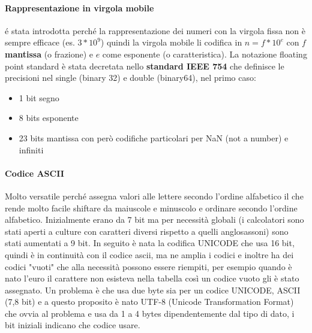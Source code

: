 \documentclass{article}
\begin{document}
\paragraph{Rappresentazione in virgola mobile} é stata introdotta perché la rappresentazione dei numeri con la virgola fissa non è sempre efficace (es. $3*10^9$) quindi la virgola mobile li codifica in $n = f*10^e$ con $f$ \textbf{mantissa} (o frazione) e $e$ come esponente (o caratteristica).
La notazione floating point standard è stata decretata nello \textbf{standard IEEE 754} che definisce le precisioni nel single (binary 32) e double (binary64), nel primo caso:
\begin{itemize}
    \item 1 bit segno
    \item 8 bits esponente
    \item 23 bits mantissa con però codifiche particolari per NaN (not a number) e infiniti
\end{itemize}


\paragraph{Codice ASCII}
Molto versatile perché assegna valori alle lettere secondo l'ordine alfabetico il che rende molto facile shiftare da maiuscole e minuscolo e ordinare secondo l'ordine alfabetico. Inizialmente erano da 7 bit ma per necessità globali (i calcolatori sono stati aperti a culture con caratteri diversi rispetto a quelli anglosassoni) sono stati aumentati a 9 bit. In seguito è nata la codifica UNICODE che usa 16 bit, quindi è in continuità con il codice ascii, ma ne amplia i codici e inoltre ha dei codici "vuoti" che alla necessità possono essere riempiti, per esempio quando è nato l'euro il carattere non esisteva nella tabella così un codice vuoto gli è stato assegnato. Un problema è che usa due byte sia per un codice UNICODE, ASCII (7,8 bit) e a questo proposito è nato UTF-8 (Unicode Transformation Format) che ovvia al problema e usa da 1 a 4 bytes dipendentemente dal tipo di dato, i bit iniziali indicano che codice usare.
\end{document}
